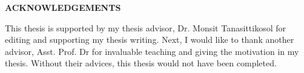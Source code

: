 
\vspace*{0.5cm} \centerline{\Large\bf ACKNOWLEDGEMENTS}
\vspace{1.5cm}
\noindent 
This thesis is supported by my thesis advisor, Dr. Monsit Tanasittikosol 
for editing and supporting my thesis writing. Next, I would like to thank another advisor, Asst. Prof. Dr
for invaluable teaching and giving the motivation in my thesis. Without their advices, this thesis would not have 
been completed. \\     



